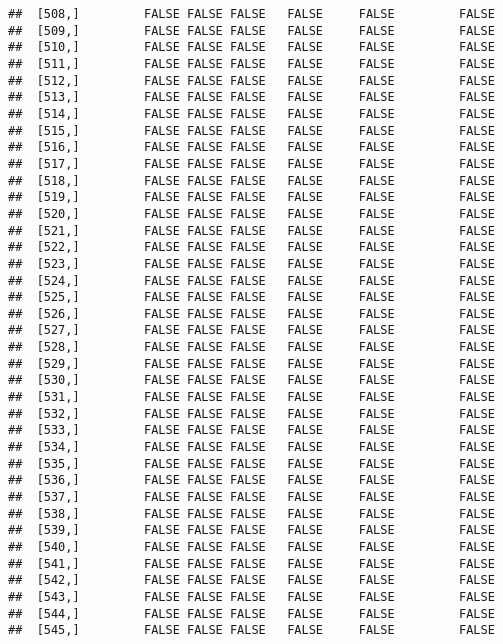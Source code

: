 \documentclass[
]{article}
\begin{document}
\begin{verbatim}
##  [508,]         FALSE FALSE FALSE   FALSE     FALSE         FALSE
##  [509,]         FALSE FALSE FALSE   FALSE     FALSE         FALSE
##  [510,]         FALSE FALSE FALSE   FALSE     FALSE         FALSE
##  [511,]         FALSE FALSE FALSE   FALSE     FALSE         FALSE
##  [512,]         FALSE FALSE FALSE   FALSE     FALSE         FALSE
##  [513,]         FALSE FALSE FALSE   FALSE     FALSE         FALSE
##  [514,]         FALSE FALSE FALSE   FALSE     FALSE         FALSE
##  [515,]         FALSE FALSE FALSE   FALSE     FALSE         FALSE
##  [516,]         FALSE FALSE FALSE   FALSE     FALSE         FALSE
##  [517,]         FALSE FALSE FALSE   FALSE     FALSE         FALSE
##  [518,]         FALSE FALSE FALSE   FALSE     FALSE         FALSE
##  [519,]         FALSE FALSE FALSE   FALSE     FALSE         FALSE
##  [520,]         FALSE FALSE FALSE   FALSE     FALSE         FALSE
##  [521,]         FALSE FALSE FALSE   FALSE     FALSE         FALSE
##  [522,]         FALSE FALSE FALSE   FALSE     FALSE         FALSE
##  [523,]         FALSE FALSE FALSE   FALSE     FALSE         FALSE
##  [524,]         FALSE FALSE FALSE   FALSE     FALSE         FALSE
##  [525,]         FALSE FALSE FALSE   FALSE     FALSE         FALSE
##  [526,]         FALSE FALSE FALSE   FALSE     FALSE         FALSE
##  [527,]         FALSE FALSE FALSE   FALSE     FALSE         FALSE
##  [528,]         FALSE FALSE FALSE   FALSE     FALSE         FALSE
##  [529,]         FALSE FALSE FALSE   FALSE     FALSE         FALSE
##  [530,]         FALSE FALSE FALSE   FALSE     FALSE         FALSE
##  [531,]         FALSE FALSE FALSE   FALSE     FALSE         FALSE
##  [532,]         FALSE FALSE FALSE   FALSE     FALSE         FALSE
##  [533,]         FALSE FALSE FALSE   FALSE     FALSE         FALSE
##  [534,]         FALSE FALSE FALSE   FALSE     FALSE         FALSE
##  [535,]         FALSE FALSE FALSE   FALSE     FALSE         FALSE
##  [536,]         FALSE FALSE FALSE   FALSE     FALSE         FALSE
##  [537,]         FALSE FALSE FALSE   FALSE     FALSE         FALSE
##  [538,]         FALSE FALSE FALSE   FALSE     FALSE         FALSE
##  [539,]         FALSE FALSE FALSE   FALSE     FALSE         FALSE
##  [540,]         FALSE FALSE FALSE   FALSE     FALSE         FALSE
##  [541,]         FALSE FALSE FALSE   FALSE     FALSE         FALSE
##  [542,]         FALSE FALSE FALSE   FALSE     FALSE         FALSE
##  [543,]         FALSE FALSE FALSE   FALSE     FALSE         FALSE
##  [544,]         FALSE FALSE FALSE   FALSE     FALSE         FALSE
##  [545,]         FALSE FALSE FALSE   FALSE     FALSE         FALSE

\end{verbatim}
\end{document}
